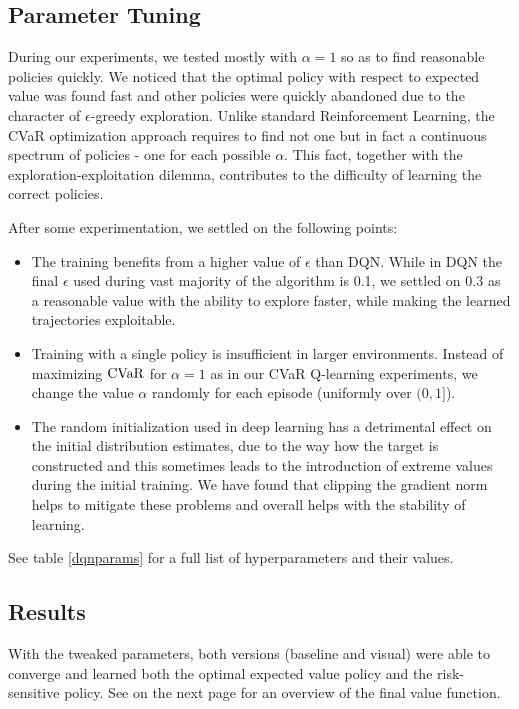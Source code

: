 \subsection{Parameter Tuning}
During our experiments, we tested mostly with $\alpha=1$ so as to find reasonable policies quickly. We noticed that the optimal policy with respect to expected value was found fast and other policies were quickly abandoned due to the character of $\epsilon$-greedy exploration. Unlike standard Reinforcement Learning, the CVaR optimization approach requires to find not one but in fact a continuous spectrum of policies - one for each possible $\alpha$. 
This fact, together with the exploration-exploitation dilemma, contributes to the difficulty of learning the correct policies.

After some experimentation, we settled on the following points: 

\begin{itemize}
\item The training benefits from a higher value of $\epsilon$ than DQN. While in DQN the final $\epsilon$ used during vast majority of the algorithm is 0.1, we settled on $0.3$ as a reasonable value with the ability to explore faster, while making the learned trajectories exploitable.

\item Training with a single policy is insufficient in larger environments. Instead of maximizing $\text{CVaR}$ for $\alpha=1$ as in our CVaR Q-learning experiments, we change the value $\alpha$ randomly for each episode (uniformly over $(0, 1]$).

\item The random initialization used in deep learning has a detrimental effect on the initial distribution estimates, due to the way how the target is constructed and this sometimes leads to the introduction of extreme values during the initial training. We have found that clipping the gradient norm helps to mitigate these problems and overall helps with the stability of learning.
\end{itemize}

See table \ref{dqnparams} for a full list of hyperparameters and their values.

\subsection{Results}

With the tweaked parameters, both versions (baseline and visual) were able to converge and learned both the optimal expected value policy and the risk-sensitive policy. See  on the next page for an overview of the final value function.

